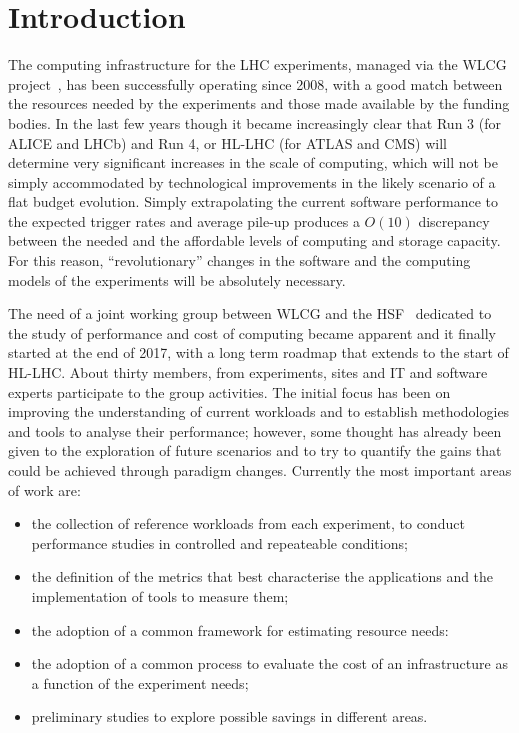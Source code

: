 \section{Introduction}
The computing infrastructure for the LHC experiments, managed via the
WLCG project~\cite{wlcg}, has been successfully operating since 2008,
with a good match between the resources needed by the experiments and
those made available by the funding bodies. In the last few years
though it became increasingly clear that Run 3 (for ALICE and LHCb)
and Run 4, or HL-LHC (for ATLAS and CMS) will determine very
significant increases in the scale of computing, which will not be
simply accommodated by technological improvements in the likely
scenario of a flat budget evolution. Simply extrapolating the current
software performance to the expected trigger rates and average pile-up
produces a $O(10)$ discrepancy between the needed and the affordable
levels of computing and storage capacity. For this reason,
``revolutionary'' changes in the software and the computing models of
the experiments will be absolutely necessary.

The need of a joint working group between WLCG and the
HSF~\cite{hsf} dedicated to the study of performance and cost of
computing became apparent and it finally started at the end of
2017, with a long term roadmap that extends to the start of
HL-LHC. About thirty members, from experiments, sites and IT and software
experts participate to the group activities. The initial focus has
been on improving the understanding of current workloads and to
establish methodologies and tools to analyse their performance; however,
some thought has already been given to the exploration of future
scenarios and to try to quantify the gains that could be achieved
through paradigm changes. Currently the most important areas of work are:
\begin{itemize}
\item the collection of reference workloads from each experiment, to conduct
  performance studies in controlled and repeateable conditions;
\item the definition of the metrics that best characterise the applications and the implementation of tools to measure them;
\item the adoption of a common framework for estimating resource needs:
\item the adoption of a common process to evaluate the cost of an infrastructure
  as a function of the experiment needs;
\item preliminary studies to explore possible savings in different areas.
\end{itemize}

